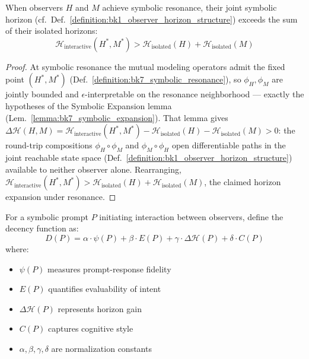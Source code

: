 \begin{proposition}
\label{proposition:bk7_horizon_expansion}
When observers $H$ and $M$ achieve symbolic resonance, their joint symbolic horizon (cf.~Def.~\ref{definition:bk1_observer_horizon_structure}) exceeds the sum of their isolated horizons:
$$\mathcal{H}_{\text{interactive}}(H^*, M^*) > \mathcal{H}_{\text{isolated}}(H) + \mathcal{H}_{\text{isolated}}(M)$$
\end{proposition}
\begin{proof}
\label{proof:bk7_horizon_expansion}
\leavevmode
At symbolic resonance the mutual modeling operators admit the fixed point $(H^*,M^*)$ (Def.~\ref{definition:bk7_symbolic_resonance}), so $\phi_H,\phi_M$ are jointly bounded and $\epsilon$-interpretable on the resonance neighborhood --- exactly the hypotheses of the Symbolic Expansion lemma (Lem.~\ref{lemma:bk7_symbolic_expansion}). That lemma gives $\Delta\mathcal{H}(H,M)=\mathcal{H}_{\text{interactive}}(H^*,M^*)-\mathcal{H}_{\text{isolated}}(H)-\mathcal{H}_{\text{isolated}}(M)>0$: the round-trip compositions $\phi_H\circ\phi_M$ and $\phi_M\circ\phi_H$ open differentiable paths in the joint reachable state space (Def.~\ref{definition:bk1_observer_horizon_structure}) available to neither observer alone. Rearranging, $\mathcal{H}_{\text{interactive}}(H^*,M^*)>\mathcal{H}_{\text{isolated}}(H)+\mathcal{H}_{\text{isolated}}(M)$, the claimed horizon expansion under resonance.
\end{proof}

\begin{definition}
\label{definition:bk7_decency_potential}
For a symbolic prompt $P$ initiating interaction between observers, define the decency function as:
$$D(P) = \alpha \cdot \psi(P) + \beta \cdot E(P) + \gamma \cdot \Delta\mathcal{H}(P) + \delta \cdot C(P)$$
where:
\begin{itemize}
\item $\psi(P)$ measures prompt-response fidelity
\item $E(P)$ quantifies evaluability of intent
\item $\Delta\mathcal{H}(P)$ represents horizon gain
\item $C(P)$ captures cognitive style
\item $\alpha, \beta, \gamma, \delta$ are normalization constants
\end{itemize}
\end{definition}

